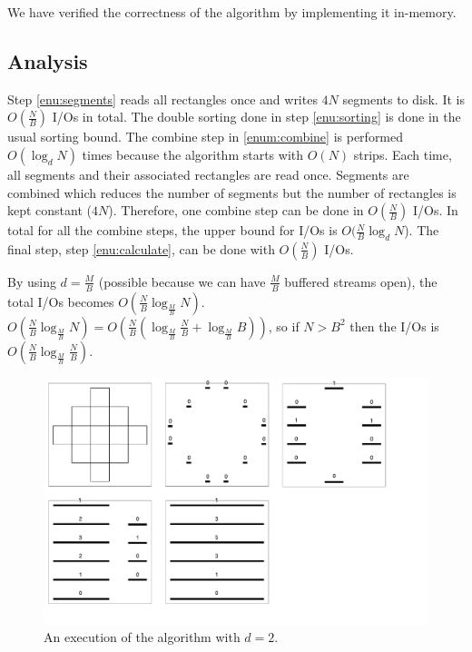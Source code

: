 We have verified the correctness of the algorithm by implementing it in-memory.

\subsection{Analysis}

Step \ref{enu:segments} reads all rectangles once and writes $4N$ segments to disk. It is $O(\frac{N}{B})$ I/Os in total. The double sorting done in step \ref{enu:sorting} is done in the usual sorting bound. The combine step in \ref{enum:combine} is performed $O(\log_{d}{N})$ times because the algorithm starts with $O(N)$ strips. Each time, all segments and their associated rectangles are read once. Segments are combined which reduces the number of segments but the number of rectangles is kept constant ($4N$). Therefore, one combine step can be done in $O(\frac{N}{B})$ I/Os. In total for all the combine steps, the upper bound for I/Os is $O(\frac{N}{B}\log_{d}{N}$). The final step, step \ref{enu:calculate}, can be done with $O(\frac{N}{B})$ I/Os.

By using $d = \frac{M}{B}$ (possible because we can have $\frac{M}{B}$ buffered streams open), the total I/Os becomes $O(\frac{N}{B}\log_{\frac{M}{B}}{N})$. $O(\frac{N}{B}\log_{\frac{M}{B}}{N})=O(\frac{N}{B}(\log_{\frac{M}{B}}{\frac{N}{B}}+\log_{\frac{M}{B}}{B}))$, so if $N>B^2$ then the I/Os is $O(\frac{N}{B}\log_{\frac{M}{B}}{\frac{N}{B}})$.


\begin{figure}[h!]
  \centering
  \includegraphics[width=1.12\textwidth]{images/Segments}
  \caption{An execution of the algorithm with $d = 2$.}
  \label{fig:segments}
\end{figure}